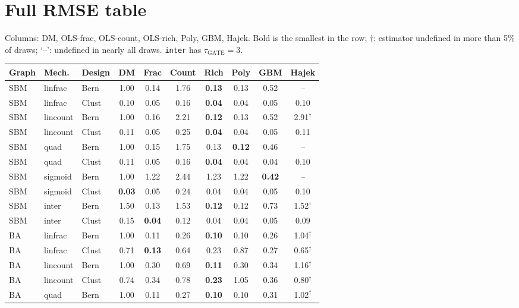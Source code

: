 \documentclass{article}
\begin{document}
\section{Full RMSE table}
Columns: DM, OLS-frac, OLS-count, OLS-rich, Poly, GBM, Hajek. Bold is the smallest in the row; $\dagger$: estimator undefined in more than 5\% of draws; `--': undefined in nearly all draws. \texttt{inter} has $\tau_{\mathrm{GATE}}=3$.
\begin{table}[h]\centering\scriptsize\setlength{\tabcolsep}{3pt}
\begin{tabular}{lllccccccc}\toprule Graph & Mech. & Design & DM & Frac & Count & Rich & Poly & GBM & Hajek\\\midrule
SBM & linfrac & Bern & 1.00 & 0.14 & 1.76 & \textbf{0.13} & 0.13 & 0.52 & -- \\
SBM & linfrac & Clust & 0.10 & 0.05 & 0.16 & \textbf{0.04} & 0.04 & 0.05 & 0.10 \\
SBM & lincount & Bern & 1.00 & 0.16 & 2.21 & \textbf{0.12} & 0.13 & 0.52 & 2.91$^\dagger$ \\
SBM & lincount & Clust & 0.11 & 0.05 & 0.25 & \textbf{0.04} & 0.04 & 0.05 & 0.11 \\
SBM & quad & Bern & 1.00 & 0.15 & 1.75 & 0.13 & \textbf{0.12} & 0.46 & -- \\
SBM & quad & Clust & 0.11 & 0.05 & 0.16 & \textbf{0.04} & 0.04 & 0.04 & 0.10 \\
SBM & sigmoid & Bern & 1.00 & 1.22 & 2.44 & 1.23 & 1.22 & \textbf{0.42} & -- \\
SBM & sigmoid & Clust & \textbf{0.03} & 0.05 & 0.24 & 0.04 & 0.04 & 0.05 & 0.10 \\
SBM & inter & Bern & 1.50 & 0.13 & 1.53 & \textbf{0.12} & 0.12 & 0.73 & 1.52$^\dagger$ \\
SBM & inter & Clust & 0.15 & \textbf{0.04} & 0.12 & 0.04 & 0.04 & 0.05 & 0.09 \\
BA & linfrac & Bern & 1.00 & 0.11 & 0.26 & \textbf{0.10} & 0.10 & 0.26 & 1.04$^\dagger$ \\
BA & linfrac & Clust & 0.71 & \textbf{0.13} & 0.64 & 0.23 & 0.87 & 0.27 & 0.65$^\dagger$ \\
BA & lincount & Bern & 1.00 & 0.30 & 0.69 & \textbf{0.11} & 0.30 & 0.34 & 1.16$^\dagger$ \\
BA & lincount & Clust & 0.74 & 0.34 & 0.78 & \textbf{0.23} & 1.05 & 0.36 & 0.80$^\dagger$ \\
BA & quad & Bern & 1.00 & 0.11 & 0.27 & \textbf{0.10} & 0.10 & 0.31 & 1.02$^\dagger$ \\

\end{tabular}
\end{table}
\end{document}

